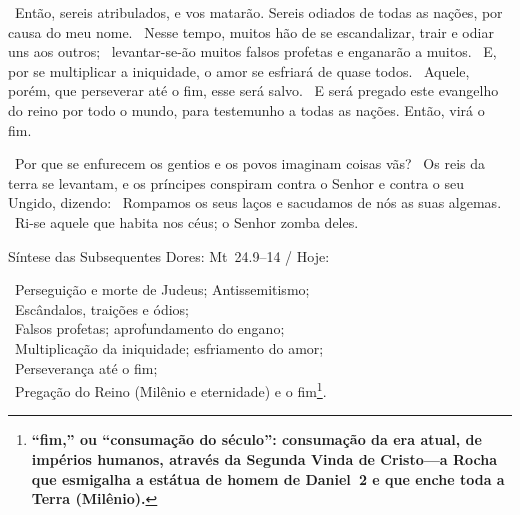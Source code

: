 \documentclass[12pt,aspectratio=169]{beamer}
\newcommand{\ver}[1]{%
    \raisebox{0.50ex}{%
        \scalebox{1.1}{%
            \pmb{\textbf{\textcolor{BSpbg}{#1}}}%
        }%
    }%
}
\newcommand{\QUOTE}[1]{%
    \par\noindent\hspace*{0.1\linewidth}%
    \begin{minipage}{0.8\linewidth}%
        \linespread{1.35}\large{#1}%
    \end{minipage}%
}
\newcommand{\WIDEQUOTE}[1]{%
    \par\noindent\hspace*{0.02\linewidth}%
    \begin{minipage}{0.92\linewidth}%
        \linespread{1.25}\large{#1}%
    \end{minipage}%
}
\newcommand{\RED}[1]{{\textcolor{TXred}{#1}}}
\newcommand{\ORA}[1]{{\textcolor{TXora}{#1}}}
\newcommand{\YEL}[1]{{\textcolor{TXyel}{#1}}}
\newcommand{\GRE}[1]{{\textcolor{TXgre}{#1}}}
\newcommand{\BLU}[1]{{\textcolor{TXblu}{#1}}}
\newcommand{\MAG}[1]{{\textcolor{TXmag}{#1}}}
\newcommand{\BRI}[1]{{\textcolor{BSpbg}{#1}}}   %
\begin{document}
    \begin{frame}
        \WIDEQUOTE{%
            \ver{(ARA) Mt~24.9}~Então, sereis \ORA{atribulados}, e \ORA{vos matarão}. Sereis
            \YEL{odiados de todas as nações}, por causa do meu nome.  \ver{10}~Nesse  tempo,
            muitos  hão  de  se  \GRE{escandalizar,  trair  e   odiar}   uns   aos   outros;
            \ver{11}~levantar-se-ão muitos \RED{falsos profetas} e \RED{enganarão} a muitos.
            \ver{12}~E, por se \MAG{multiplicar a iniquidade}, o amor se  \MAG{esfriará}  de
            quase todos. \ver{13}~Aquele, porém, que perseverar até o \BLU{fim},  esse  será
            salvo. \ver{14}~E será \BRI{pregado este evangelho do reino} por todo  o  mundo,
            para testemunho a todas as nações. Então, virá o \BLU{fim}.
        }
    \end{frame}

    \begin{frame}
        \QUOTE{%
            \ver{(ARA) Sl~2.1}~Por que  se  enfurecem  os  \ORA{gentios}  e  os  \ORA{povos}
            imaginam  coisas  vãs?  \ver{2}~Os  \YEL{reis}  da  terra  se  levantam,  e   os
            \GRE{príncipes} \RED{conspiram contra o Senhor e contra o seu Ungido},  dizendo:
            \ver{3}~\RED{Rompamos os seus laços} e \RED{sacudamos de nós as  suas  algemas}.
            \ver{4}~\MAG{Ri-se aquele que habita nos céus; o Senhor zomba deles}.
        }
    \end{frame}

    \begin{frame}{\BRI{Síntese das Subsequentes Dores: Mt~24.9--14 / Hoje:}
        \only<2>{\YEL{\pmb{$\otimes$}}}}
        \QUOTE{%
            \ver{ 9}~\YEL{Perseguição e morte de Judeus}; \ORA{Antissemitismo}; \\
            \ver{10}~\GRE{Escândalos, traições e ódios}; \\
            \ver{11}~\RED{Falsos profetas}; \RED{aprofundamento do engano}; \\
            \ver{12}~\MAG{Multiplicação da iniquidade}; \MAG{esfriamento do amor};
                \only<2>{\YEL{\pmb{$\otimes$}}} \\
            \ver{13}~Perseverança até o \BLU{fim}; \\
            \ver{14}~\BRI{Pregação do Reino} (Milênio e eternidade) e o \BLU{fim}\footnote{
                \textbf{``\BLU{fim},'' ou ``\BLU{consumação do século}'': consumação da  era
                atual, de impérios humanos, através da Segunda Vinda de Cristo---a Rocha que
                esmigalha a estátua de homem de Daniel~2  e  que  \BRI{enche  toda  a  Terra
                (Milênio)}.}
            }.
        }
    \end{frame}
\end{document}

